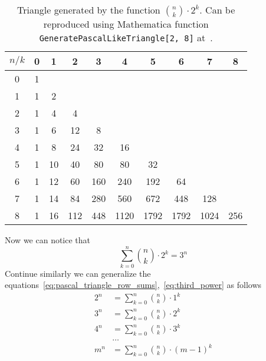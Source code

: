 \begin{table}[H]
    \begin{tabular}{c|ccccccccc}
        $n/k$ & 0 & 1  & 2   & 3   & 4    & 5    & 6    & 7    & 8 \\ [3px]
        \hline
        0     & 1 &    &     &     &      &      &      &      &     \\
        1     & 1 & 2  &     &     &      &      &      &      &     \\
        2     & 1 & 4  & 4   &     &      &      &      &      &     \\
        3     & 1 & 6  & 12  & 8   &      &      &      &      &     \\
        4     & 1 & 8  & 24  & 32  & 16   &      &      &      &     \\
        5     & 1 & 10 & 40  & 80  & 80   & 32   &      &      &     \\
        6     & 1 & 12 & 60  & 160 & 240  & 192  & 64   &      &     \\
        7     & 1 & 14 & 84  & 280 & 560  & 672  & 448  & 128  &     \\
        8     & 1 & 16 & 112 & 448 & 1120 & 1792 & 1792 & 1024 & 256 \\
    \end{tabular}
    \caption{Triangle generated by the function $\binom{n}{k}\cdot 2^k$.
    Can be reproduced using Mathematica function \texttt{GeneratePascalLikeTriangle[2, 8]} at~\cite{PK22Source}.}
    \label{tab:third_power}
\end{table}
Now we can notice that
\begin{equation}
    \sum_{k=0}^{n} \binom{n}{k} \cdot 2^k = 3^n\label{eq:third_power}
\end{equation}
Continue similarly we can generalize the equations~\eqref{eq:pascal_triangle_row_sums},~\eqref{eq:third_power} as follows
\begin{align*}
    2^n &= \sum_{k=0}^{n}\binom{n}{k} \cdot 1^k \\
    3^n &= \sum_{k=0}^{n}\binom{n}{k} \cdot 2^k \\
    4^n &= \sum_{k=0}^{n}\binom{n}{k} \cdot 3^k \\
    &\dots \\
    m^n &= \sum_{k=0}^{n}\binom{n}{k} \cdot (m-1)^k
\end{align*}
